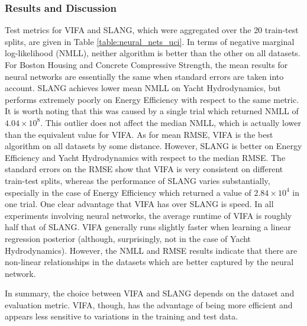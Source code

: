 \documentclass[msc,deptreport.inf]{infthesis} %
\begin{document}
\subsubsection{Results and Discussion} 

Test metrics for VIFA and SLANG, which were aggregated over the 20 train-test splits, are given in Table \ref{table:neural_nets_uci}. In terms of negative marginal log-likelihood (NMLL), neither algorithm is better than the other on all datasets. For Boston Housing and Concrete Compressive Strength, the mean results for neural networks are essentially the same when standard errors are taken into account. SLANG achieves lower mean NMLL on Yacht Hydrodynamics, but performs extremely poorly on Energy Efficiency with respect to the same metric. It is worth noting that this was caused by a single trial which returned NMLL of $4.04 \times 10^{8}$. This outlier does not affect the median NMLL, which is actually lower than the equivalent value for VIFA. As for mean RMSE, VIFA is the best algorithm on all datasets by some distance. However, SLANG is better on Energy Efficiency and Yacht Hydrodynamics with respect to the median RMSE. The standard errors on the RMSE show that VIFA is very consistent on different train-test splits, whereas the performance of SLANG varies substantially, especially in the case of Energy Efficiency which returned a value of $2.84 \times 10^{4}$ in one trial.  One clear advantage that VIFA has over SLANG is speed. In all experiments involving neural networks, the average runtime of VIFA is roughly half that of SLANG. VIFA generally runs slightly faster when learning a linear regression posterior (although, surprisingly, not in the case of Yacht Hydrodynamics). However, the NMLL and RMSE results indicate that there are non-linear relationships in the datasets which are better captured by the neural network. 

In summary, the choice between VIFA and SLANG depends on the dataset and evaluation metric. VIFA, though, has the advantage of being more efficient and appears less sensitive to variations in the training and test data. 
\end{document}
